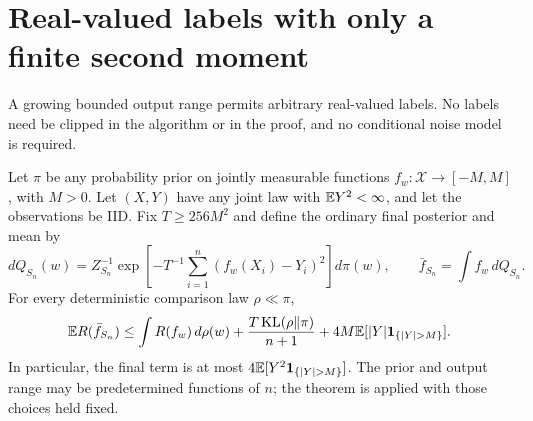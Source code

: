 \section{Real-valued labels with only a finite second moment}
\label{sec:finite-variance-transfer}
A growing bounded output range permits arbitrary real-valued labels.
No labels need be clipped in the algorithm or in the proof, and no
conditional noise model is required.

\begin{theorem}
\label{thm:finite-variance-posterior}
Let $\pi$ be any probability prior on jointly measurable functions
$f_w:\mathcal X\to[-M,M]$, with $M>0$. Let $(X,Y)$ have any joint
law with $\mathbb E Y^2<\infty$, and let the observations be IID.
Fix $T\ge256M^2$ and define the ordinary final posterior and mean by
\[
 dQ_{S_n}(w)=Z_{S_n}^{-1}
  \exp\!\left[-T^{-1}\sum_{i=1}^n(f_w(X_i)-Y_i)^2\right]d\pi(w),
 \qquad \bar f_{S_n}=\int f_w\,dQ_{S_n}.
\]
For every deterministic comparison law $\rho\ll\pi$,
\begin{equation}
 \E R(\bar f_{S_n})
 \le\int R(f_w)\,d\rho(w)
     +\frac{T\operatorname{KL}(\rho\|\pi)}{n+1}
     +4M\E[|Y|\mathbf1_{\{|Y|>M\}}].
 \label{eq:finite-variance-posterior}
\end{equation}
In particular, the final term is at most
$4\E[Y^2\mathbf1_{\{|Y|>M\}}]$.
The prior and output range may be predetermined functions of $n$;
the theorem is applied with those choices held fixed.
\end{theorem}
